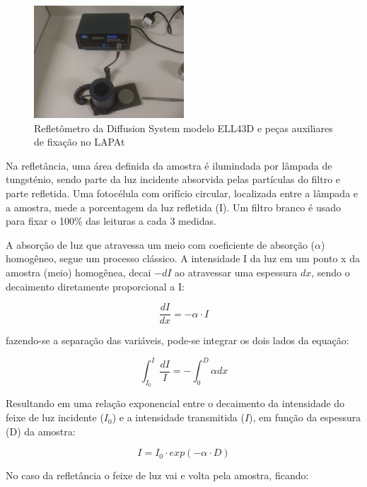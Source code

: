 \begin{figure}[H]
  \centering
  \includegraphics[width=0.5\textwidth]{../inputs/images/refletometro.jpg}
  \caption{Refletômetro da Diffusion System modelo ELL43D 
           e peças auxiliares de fixação no LAPAt}
\end{figure}

Na refletância, uma área definida da amostra é ilumindada por lâmpada de 
tungsténio, sendo parte da luz incidente absorvida pelas partículas do 
filtro e parte refletida. Uma fotocélula com orifício circular, localizada
entre a lâmpada e a amostra, mede a porcentagem da luz refletida (I).
Um filtro branco é usado para fixar o 100\% das leituras a cada 3 medidas.

A absorção de luz que atravessa um meio com coeficiente de absorção ($\alpha$) 
homogêneo, segue um processo clássico. A intensidade I da luz em um ponto x da
amostra (meio) homogênea, decai $-dI$ ao atravessar uma espessura $dx$, 
sendo o decaimento diretamente proporcional a I:

\begin{equation}
  \label{eq:dIdx}
   \frac{dI}{dx} = -\alpha \cdot I
\end{equation}

fazendo-se a separação das variáveis, pode-se integrar os dois lados da equação:

\begin{equation}
  \int_{I_0}^{I} \frac{dI}{I} = - \int_{0}^{D} \alpha dx
\end{equation}

Resultando em uma relação exponencial entre o decaimento da intensidade do feixe
de luz incidente ($I_0$) e a intensidade transmitida ($I$), 
em função da espessura (D) da amostra:

\begin{equation}
  \label{eq:I_BC}
  I = I_0 \cdot exp(-\alpha \cdot D)
\end{equation}

No caso da refletância o feixe de luz vai e volta pela amostra, ficando:

